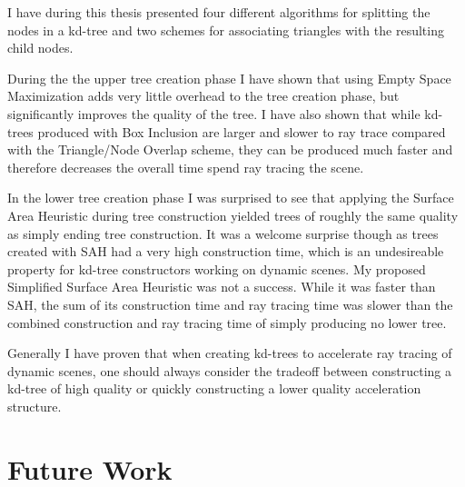 
I have during this thesis presented four different algorithms for splitting the
nodes in a kd-tree and two schemes for associating triangles with the resulting
child nodes.

During the the upper tree creation phase I have shown that using Empty Space
Maximization adds very little overhead to the tree creation phase, but
significantly improves the quality of the tree. I have also shown that while
kd-trees produced with Box Inclusion are larger and slower to ray trace compared
with the Triangle/Node Overlap scheme, they can be produced much faster and
therefore decreases the overall time spend ray tracing the scene.

In the lower tree creation phase I was surprised to see that applying the
Surface Area Heuristic during tree construction yielded trees of roughly the
same quality as simply ending tree construction. It was a welcome surprise
though as trees created with SAH had a very high construction time, which is an
undesireable property for kd-tree constructors working on dynamic scenes. My
proposed Simplified Surface Area Heuristic was not a success. While it was
faster than SAH, the sum of its construction time and ray tracing time was
slower than the combined construction and ray tracing time of simply producing
no lower tree.



Generally I have proven that when creating kd-trees to accelerate ray tracing of
dynamic scenes, one should always consider the tradeoff between constructing a
kd-tree of high quality or quickly constructing a lower quality acceleration
structure.








\chapter{Future Work}\label{chp:future}

